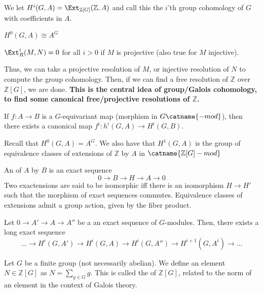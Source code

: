 \documentclass[12pt]{scrartcl}
\begin{document}
\begin{definition}
	We let $H^{i}(G, A) = \Ext_{\mathbb{Z}[G]}(\mathbb{Z}, A)$ and call this the $i$'th group cohomology of $G$ with coefficients in $A$.
\end{definition}

\begin{corollary}
$H^0(G, A) \cong A^G$ 
\end{corollary}

\begin{theorem}
$\Ext_R^i(M, N) = 0$ for all $i>0$ if $M$ is projective (also true for $M$ injective).   
\end{theorem}

Thus, we can take a projective resolution of $M$, or injective resolution of $N$ to compute the group cohomology.
Then, if we can find a free resolution of $\mathbb{Z}$ over $\mathbb{Z}[G]$, we are done.
\textbf{This is the central idea of group/Galois cohomology, to find some canonical free/projective resolutions of $\mathbb{Z}$.}

\begin{corollary}
	If $f: A \to B$ is a $G$-equivariant map (morphism in $G\catname{-mod}$), then there exists a canonical map $f^i: h^i(G, A) \to H^i(G, B)$. 
\end{corollary}

\begin{corollary}
Recall that $H^0(G, A) = A^G$.
We also have that $H^1(G, A)$ is the group of equivalence classes of extensions of $\mathbb{Z}$ by $A$ in $\catname{\mathbb{Z}[G]-mod}$  
\end{corollary}
An  of $A$ by $B$ is an exact sequence
	\[
	0 \to B \to H \to A \to 0
	\] 
	Two exactensions are said to be isomorphic iff there is an isomorphism $H \to H'$ such that the morphism of exact sequences commutes.
	Equivalence classes of extensions admit a group action, given by the fiber product.
	\begin{corollary}
	Let $0 \to A' \to A \to A''$ be a an exact sequence of $G$-modules.
	Then, there exists a long exact sequence
	\[
\dots \to H^i(G, A') \to H^i(G, A) \to H^i(G, A'') \to H^{i+1}(G, A^i) \to \dots	
	\] 
	\end{corollary}
	
	Let $G$ be a finite group (not necessarily abelian).
	We define an element $N \in \mathbb{Z}[G]$ as $N = \sum_{g \in G} g$.
	This is called the  of $\mathbb{Z}[G]$, related to the norm of an element in the context of Galois theory. 
\end{document}
